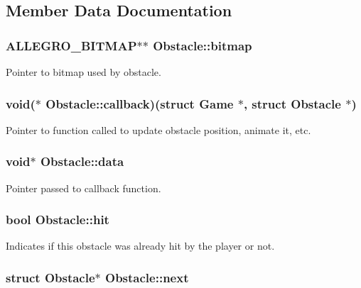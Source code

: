 \subsection{\-Member \-Data \-Documentation}
\hypertarget{structObstacle_a1f35f88fe8f6d0664da082f82ae4b774}{
\subsubsection[{bitmap}]{\setlength{\rightskip}{0pt plus 5cm}\-A\-L\-L\-E\-G\-R\-O\-\_\-\-B\-I\-T\-M\-A\-P$\ast$$\ast$ {\bf \-Obstacle\-::bitmap}}}\label{structObstacle_a1f35f88fe8f6d0664da082f82ae4b774}
\-Pointer to bitmap used by obstacle. \hypertarget{structObstacle_a21b4ff0edaa2dc5394ff7a6328e48358}{
\subsubsection[{callback}]{\setlength{\rightskip}{0pt plus 5cm}void($\ast$ {\bf \-Obstacle\-::callback})(struct {\bf \-Game} $\ast$, struct {\bf \-Obstacle} $\ast$)}}\label{structObstacle_a21b4ff0edaa2dc5394ff7a6328e48358}
\-Pointer to function called to update obstacle position, animate it, etc. \hypertarget{structObstacle_a88728e624cc62993e2bf52aff816cdff}{
\subsubsection[{data}]{\setlength{\rightskip}{0pt plus 5cm}void$\ast$ {\bf \-Obstacle\-::data}}}\label{structObstacle_a88728e624cc62993e2bf52aff816cdff}
\-Pointer passed to callback function. \hypertarget{structObstacle_ac89d025f4ad7c2f083d262c1bee4e851}{
\subsubsection[{hit}]{\setlength{\rightskip}{0pt plus 5cm}bool {\bf \-Obstacle\-::hit}}}\label{structObstacle_ac89d025f4ad7c2f083d262c1bee4e851}
\-Indicates if this obstacle was already hit by the player or not. \hypertarget{structObstacle_aedbcf65351fa59ca9f18f6fba0287dc1}{
\subsubsection[{next}]{\setlength{\rightskip}{0pt plus 5cm}struct {\bf \-Obstacle}$\ast$ {\bf \-Obstacle\-::next}}}\label{structObstacle_aedbcf65351fa59ca9f18f6fba0287dc1}
